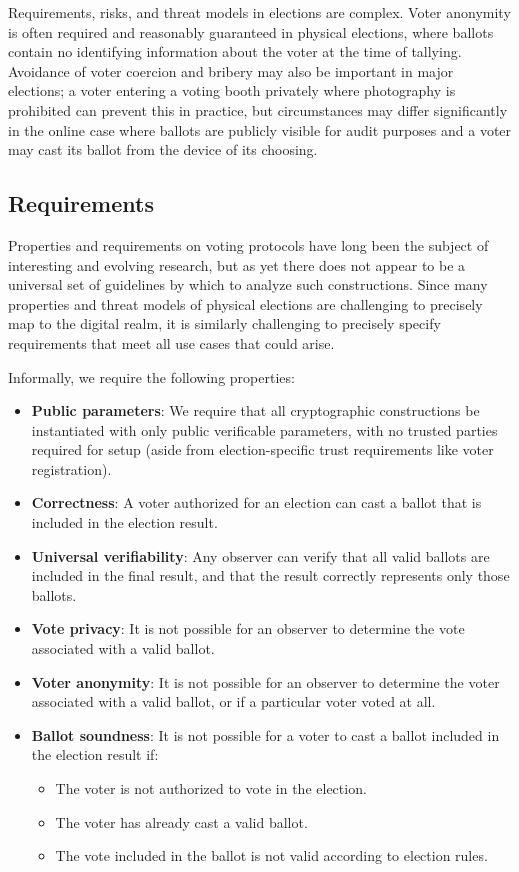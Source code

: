 \documentclass{article}
\begin{document}
Requirements, risks, and threat models in elections are complex.
Voter anonymity is often required and reasonably guaranteed in physical elections, where ballots contain no identifying information about the voter at the time of tallying.
Avoidance of voter coercion and bribery may also be important in major elections; a voter entering a voting booth privately where photography is prohibited can prevent this in practice, but circumstances may differ significantly in the online case where ballots are publicly visible for audit purposes and a voter may cast its ballot from the device of its choosing.


\subsection{Requirements}

Properties and requirements on voting protocols have long been the subject of interesting and evolving research, but as yet there does not appear to be a universal set of guidelines by which to analyze such constructions.
Since many properties and threat models of physical elections are challenging to precisely map to the digital realm, it is similarly challenging to precisely specify requirements that meet all use cases that could arise.

Informally, we require the following properties:
\begin{itemize}
    \item \textbf{Public parameters}: We require that all cryptographic constructions be instantiated with only public verificable parameters, with no trusted parties required for setup (aside from election-specific trust requirements like voter registration).
    \item \textbf{Correctness}: A voter authorized for an election can cast a ballot that is included in the election result.
    \item \textbf{Universal verifiability}: Any observer can verify that all valid ballots are included in the final result, and that the result correctly represents only those ballots.
    \item \textbf{Vote privacy}: It is not possible for an observer to determine the vote associated with a valid ballot.
    \item \textbf{Voter anonymity}: It is not possible for an observer to determine the voter associated with a valid ballot, or if a particular voter voted at all.
    \item \textbf{Ballot soundness}: It is not possible for a voter to cast a ballot included in the election result if:
    \begin{itemize}
        \item The voter is not authorized to vote in the election.
        \item The voter has already cast a valid ballot.
        \item The vote included in the ballot is not valid according to election rules.
    \end{itemize}
\end{itemize}
\end{document}
